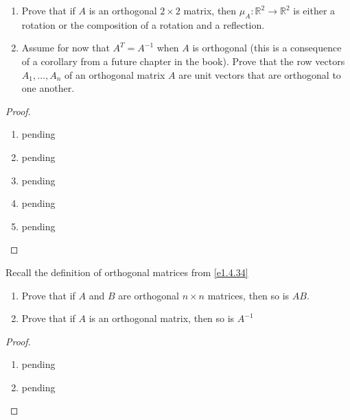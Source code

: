 \begin{exercise}
\begin{enumerate}
        \item Prove that if \( A \) is an orthogonal \( 2 \times 2 \) matrix, then \( \mu_A: \mathbb{R}^2 \rightarrow \mathbb{R}^2 \) is either a rotation or the composition of a rotation and a reflection.
        
        \item Assume for now that \( A^T = A^{-1} \) when \( A \) is orthogonal (this is a consequence of a corollary from a future chapter in the book). Prove that the row vectors \( A_1, \ldots, A_n \) of an orthogonal matrix \( A \) are unit vectors that are orthogonal to one another.
    \end{enumerate}
    
    \begin{proof}
        \begin{enumerate}
            \item pending
            
            \item pending
            
            \item pending
            
            \item pending
            
            \item pending
        \end{enumerate}
    \end{proof}
\end{exercise} %

\begin{exercise} \label{e1.4.35}
    Recall the definition of orthogonal matrices from \ref{e1.4.34}
    
    \begin{enumerate}
        \item Prove that if \( A \) and \( B \) are orthogonal \( n \times n \) matrices, then so is \( AB \).
        
        \item Prove that if \( A \) is an orthogonal matrix, then so is \( A^{-1} \)
    \end{enumerate}
    
    \begin{proof}
        \begin{enumerate}
            \item pending
            
            \item pending
        \end{enumerate}
    \end{proof}
\end{exercise} %

